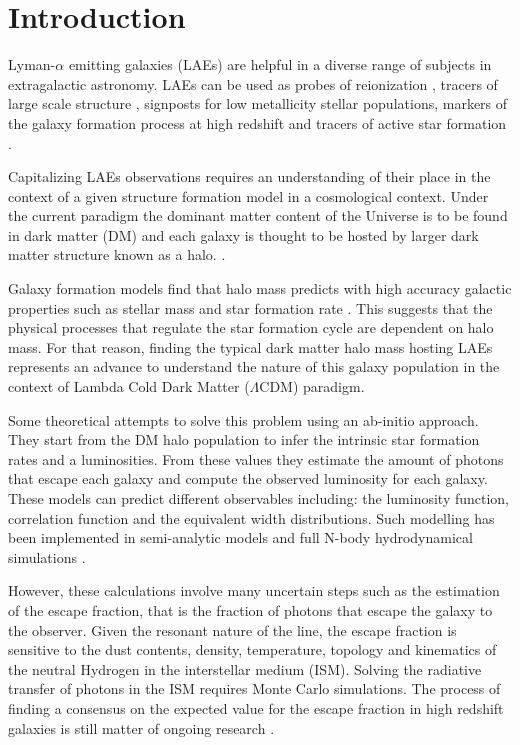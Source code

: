 \documentclass{emulateapj}
\newcommand{\ly}{{\ifmmode{{\rm Ly}\alpha}\else{Ly$\alpha$~}\fi}}
\begin{document}
\section{Introduction}

Lyman-$\alpha$ emitting galaxies (LAEs) are helpful in a diverse range
of subjects in extragalactic astronomy. LAEs can be
used as probes of reionization \citep{Dijkstra11}, tracers of large
scale structure \citep{Koehler2007},  signposts for low metallicity
stellar populations, markers of the galaxy formation process at high
redshift \citep{Dayal2009,ForeroRomero2012} and tracers of active star
formation \citep{Guaita2013}. 

Capitalizing LAEs observations requires an understanding of
their place in the context of a given structure formation model in a
cosmological context. Under the current paradigm the dominant matter
content of the Universe is to be found in dark matter (DM) and each
galaxy is thought to be hosted by larger dark matter structure known
as a halo. \citep{Peebles1980,SpringelNature05}. 

Galaxy formation models find that halo mass predicts with high
accuracy galactic properties such as stellar mass and star formation
rate \citep{Behroozi2013a}. This suggests that the
physical processes that regulate the star formation cycle are 
dependent on halo mass.  For that reason, finding the typical dark
matter halo mass hosting LAEs represents an advance to understand the
nature of this galaxy population in the context of Lambda Cold Dark
Matter ($\Lambda$CDM) paradigm.  

Some theoretical attempts to solve this problem using an  ab-initio
approach. They start from the DM halo population to infer the
intrinsic star formation rates and \ly a luminosities. From these
values they estimate the amount of \ly photons that
escape each galaxy and compute the observed luminosity for each
galaxy. These models can predict different observables including: the
luminosity function, correlation function and the equivalent width
distributions. Such modelling has been implemented in semi-analytic
models \citep{Garel2012,Orsi2012} and  full N-body
hydrodynamical simulations \citep{Laursen2007, Dayal2009,
  ForeroRomero2011, Yajima2012}. 

However, these calculations involve many uncertain steps such as 
the estimation of the escape fraction, that is the fraction of \ly
photons that escape the galaxy to the observer. Given the resonant
nature of the \ly line, the escape fraction is sensitive to  the dust
contents, density, temperature, topology and kinematics of the neutral
Hydrogen in the interstellar medium (ISM). Solving the radiative
transfer of \ly photons in the ISM requires Monte Carlo
simulations. The process of finding a consensus on the expected value
for the \ly escape fraction in high redshift galaxies is still matter
of ongoing research
\citep{Neufeld1991,Verhamme2006,ForeroRomero2011,Dijkstra2012,Laursen2013,Orsi2012}.   
\end{document}
